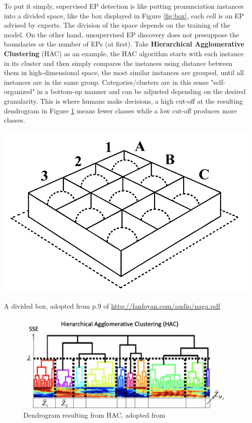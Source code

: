 \documentclass[nobib]{tufte-handout}
\begin{document}
To put it simply, supervised EP detection is like putting pronunciation instances into a divided space, like the box displayed in Figure \ref{fig:box}, each cell is an EP advised by experts. The division of the space depends on the training of the model. On the other hand, unsupervised EP discovery does not presuppose the boundaries or the number of EPs (at first). Take \textbf{Hierarchical Agglomerative Clustering} (HAC) as an example, the HAC algorithm starts with each instance in its cluster and then simply compares the instances using distance between them in high-dimensional space, the most similar instances are grouped, until all instances are in the same group. Categories/clusters are in this sense "self-organized" in a bottom-up manner and can be adjusted depending on the desired granularity. This is where humans make decisions, a high cut-off at the resulting dendrogram in Figure \ref{fig:dendro} means fewer classes while a low cut-off produces more classes. 
\bigskip
\begin{marginfigure}
  \includegraphics{box.png}
  \caption{A divided box, adopted from p.9 of \url{http://fanfoyan.com/audio/naga.pdf}}
  \label{fig:box}
\end{marginfigure}
\vspace{5em}
\begin{figure}
  \includegraphics{dendro.png}
  \caption{Dendrogram resulting from HAC, adopted from \cite{wang2015supervised}}
  \label{fig:dendro}
\end{figure}
\end{document}
